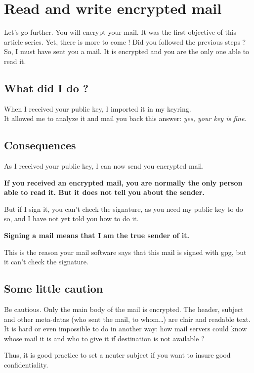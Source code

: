 \chapter{Read and write encrypted mail}

Let's go further. You will encrypt your mail. It was the first objective of this article series. Yet, there is more to come !
Did you followed the previous steps ? So, I must have sent you a mail. It is encrypted and you are the only one able to read it.

\section{What did I do ?}\label{what-did-i-do}

When I received your public key, I imported it in my keyring.\\It
allowed me to analyze it and mail you back this answer: \emph{yes, your
key is fine}.

\section{Consequences}\label{consequences}

As I received your public key, I can now send you encrypted mail.

\textbf{If you received an encrypted mail, you are normally the only person able to read it. But it does not tell you about the sender.}

But if I sign it, you can't check the signature, as you need my public key to do so, and I have not yet told you how to do it.

\textbf{Signing a mail means that I am the true sender of it.}

This is the reason your mail software says that this mail is signed with
gpg, but it can't check the signature.

\section{Some little caution}\label{some-little-caution}

Be cautious. Only the main body of the mail is encrypted. The header, subject and other meta-datas (who sent the mail, to whom\ldots{}) are
clair and readable text. It is hard or even impossible to do in another way: how mail servers could know whose mail it is and who to give it if
destination is not available ?

Thus, it is good practice to set a neuter subject if you want to insure good confidentiality.

